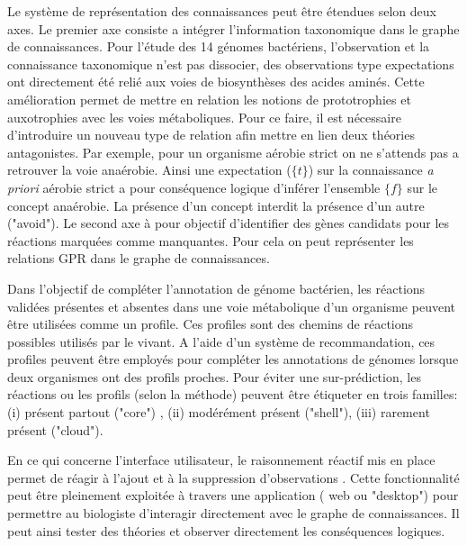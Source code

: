 \begin{refsegment}
Le système de représentation des connaissances peut être étendues selon deux axes. Le premier axe consiste a intégrer l'information taxonomique dans le graphe de connaissances. Pour l'étude des 14 génomes bactériens, l'observation et la connaissance taxonomique n'est pas dissocier, des observations type expectations ont directement été relié aux voies de biosynthèses des acides aminés. Cette amélioration permet de mettre en relation les notions de prototrophies et auxotrophies avec les voies métaboliques. Pour ce faire, il est nécessaire d'introduire un nouveau type de relation afin mettre en lien deux théories antagonistes.  Par exemple, pour un organisme aérobie strict on ne s'attends pas a retrouver la voie anaérobie. Ainsi une expectation ($\{t\}$) sur la connaissance \textit{a priori} aérobie strict a pour conséquence logique d'inférer l'ensemble $\{f\}$ sur le concept anaérobie. La présence d'un concept interdit la présence d'un autre ("avoid"). Le second axe à pour objectif d'identifier des gènes candidats pour les réactions marquées comme manquantes. Pour cela on peut représenter les relations \gls{GPR} dans le graphe de connaissances.

Dans l'objectif de compléter l'annotation de génome bactérien, les réactions validées présentes et absentes dans une voie métabolique d'un organisme peuvent être utilisées comme un profile. Ces profiles sont des chemins de réactions possibles utilisés par le vivant. A l'aide d'un système de recommandation, ces profiles peuvent être employés pour compléter les annotations de génomes lorsque deux organismes ont des profils proches. Pour éviter une sur-prédiction, les réactions ou les profils (selon la méthode) peuvent être étiqueter en trois familles: (i) présent partout ("core") , (ii) modérément présent ("shell"), (iii) rarement présent ("cloud").


En ce qui concerne l'interface utilisateur, le raisonnement réactif mis en place permet de réagir à l'ajout et à la suppression  d'observations . Cette fonctionnalité peut être pleinement exploitée à travers une application ( web ou "desktop") pour permettre au biologiste d'interagir directement avec le graphe de connaissances. Il peut ainsi tester des théories et observer directement les conséquences logiques.

\subbibliography
\end{refsegment}